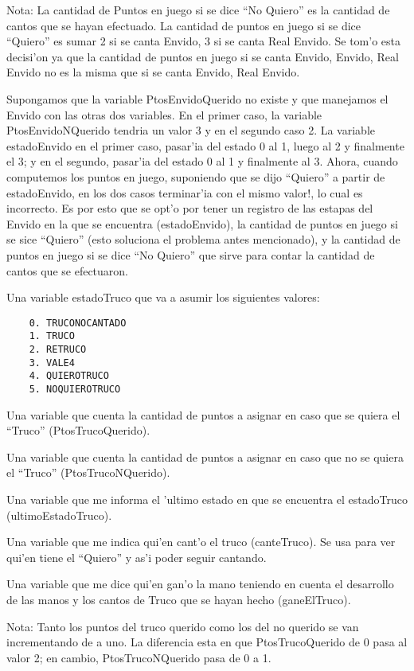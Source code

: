 Nota: La cantidad de Puntos en juego si se dice ``No Quiero'' es la cantidad de cantos que se hayan efectuado. La cantidad de puntos en juego si se dice ``Quiero'' es sumar 2 si se canta Envido, 3 si se canta Real Envido. Se tom'o esta decisi'on ya que la cantidad de puntos en juego si se canta Envido, Envido, Real Envido no es la misma que si se canta Envido, Real Envido.

Supongamos que la variable PtosEnvidoQuerido no existe y que manejamos el Envido con las otras dos variables. En el primer caso, la variable PtosEnvidoNQuerido tendria un valor 3 y en el segundo caso 2. La variable estadoEnvido en el primer caso, pasar'ia del estado 0 al 1, luego al 2 y finalmente el 3; y en el segundo, pasar'ia del estado 0 al 1 y finalmente al 3. Ahora, cuando computemos los puntos en juego, suponiendo que se dijo ``Quiero'' a partir de estadoEnvido, en los dos casos terminar'ia con el mismo valor!, lo cual es incorrecto. Es por esto que se opt'o por tener un registro de las estapas del Envido en la que se encuentra (estadoEnvido), la cantidad de puntos en juego si se sice ``Quiero'' (esto soluciona el problema antes mencionado), y la cantidad de puntos en juego si se dice ``No Quiero'' que sirve para contar la cantidad de cantos que se efectuaron.


Una variable estadoTruco que va a asumir los siguientes valores:
\begin{verbatim}
    0. TRUCONOCANTADO
    1. TRUCO
    2. RETRUCO
    3. VALE4
    4. QUIEROTRUCO
    5. NOQUIEROTRUCO
\end{verbatim}

Una variable que cuenta la cantidad de puntos a asignar en caso que se quiera el ``Truco'' (PtosTrucoQuerido).

Una variable que cuenta la cantidad de puntos a asignar en caso que no se quiera el ``Truco'' (PtosTrucoNQuerido).

Una variable que me informa el 'ultimo estado en que se encuentra el estadoTruco (ultimoEstadoTruco).

Una variable que me indica qui'en cant'o el truco (canteTruco). Se usa para ver qui'en tiene el ``Quiero'' y as'i poder seguir cantando.

Una variable que me dice qui'en gan'o la mano teniendo en cuenta el desarrollo de las manos y los cantos de Truco que se hayan hecho (ganeElTruco).

Nota: Tanto los puntos del truco querido como los del no querido se van incrementando de a uno. La diferencia esta en que PtosTrucoQuerido de 0 pasa al valor 2; en cambio, PtosTrucoNQuerido pasa de 0 a 1.
